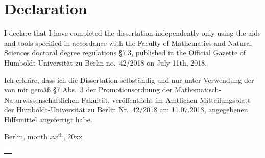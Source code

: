 \chapter*{Declaration}






I declare that I have completed the dissertation independently only using the aids and tools specified in accordance with the Faculty of Mathematics and Natural Sciences doctoral degree regulations \S 7.3, published in the Official Gazette of Humboldt-Universit\"at zu Berlin no.\ 42/2018 on July 11th, 2018.

\noindent Ich erkl\"are, dass ich die Dissertation selbst\"andig und nur unter Verwendung der von mir gem\"aß \S 7 Abs.\ 3 der Promotionsordnung der Mathematisch-Naturwissenschaft\-li\-chen Fakult\"at, ver\"offentlicht im Amtlichen Mitteilungsblatt der Humboldt-Universit\"at zu Berlin Nr.\ 42/2018 am 11.07.2018, angegebenen Hilfsmittel angefertigt habe.




\vspace{2\baselineskip}

\noindent Berlin, month $xx^{\mathrm{th}}$, 20xx
%
\vspace{0.1cm}
\\
\hspace*{\fill}\begin{tabular}{@{}l@{}}\hline
	\makebox[5cm]{name}
\end{tabular}